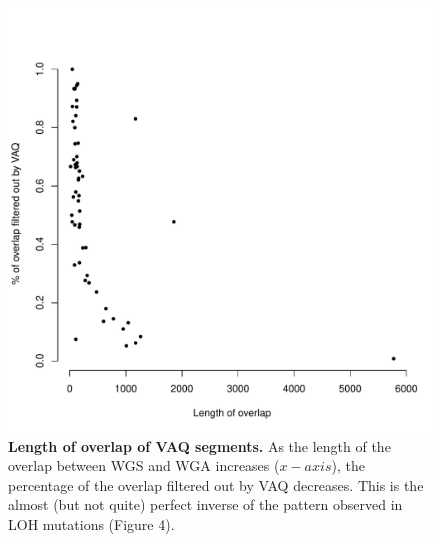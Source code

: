 \documentclass[11pt]{article} %
\begin{document}
\begin{figure}
\centerline{
\includegraphics[width=5in]{./LOH_VAQ/VAQ_all.pdf} }
\caption{ \textbf{Length of overlap of VAQ segments.} As the length of the overlap between WGS and WGA increases ($x-axis$), the percentage of the overlap filtered out by VAQ decreases. This is the almost (but not quite) perfect inverse of the pattern observed in LOH mutations (Figure 4).}
\end{figure}
\end{document}
